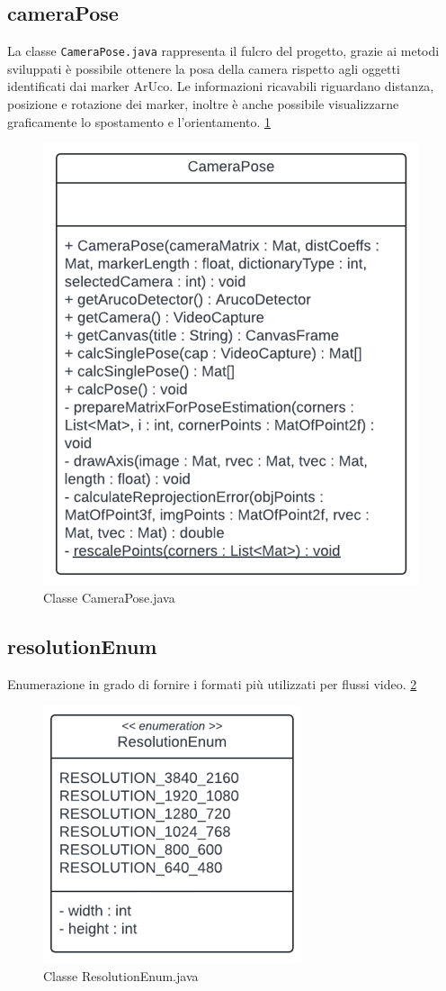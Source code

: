 \documentclass[12pt,a4paper,openright,twoside]{book}
\begin{document}
\subsection{cameraPose}
La classe \texttt{CameraPose.java} rappresenta il fulcro del progetto, grazie ai metodi sviluppati è possibile ottenere la posa della camera rispetto agli oggetti identificati dai marker ArUco. Le informazioni ricavabili riguardano distanza, posizione e rotazione dei marker, inoltre è anche possibile visualizzarne graficamente lo spostamento e l'orientamento. \ref{fig:camera_pose}
\begin{figure}
	\centering
	\includegraphics[width=0.5\linewidth]{./figures/UML/cameraPose.png}
	\caption{Classe CameraPose.java}
	\label{fig:camera_pose}
\end{figure}
\subsection{resolutionEnum}
Enumerazione in grado di fornire i formati più utilizzati per flussi video. \ref{fig:resolution_enum}
\begin{figure}
	\centering
	\includegraphics[width=0.5\linewidth]{./figures/UML/resolutionEnum.png}
	\caption{Classe ResolutionEnum.java}
	\label{fig:resolution_enum}
\end{figure}
\end{document}
